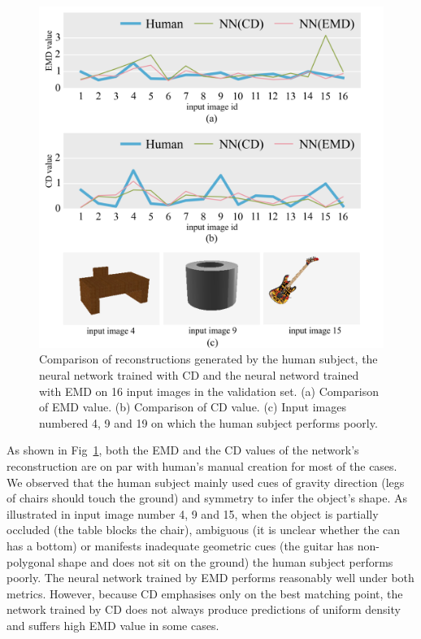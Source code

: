 \begin{figure}
\centering
\includegraphics[width=1.0\linewidth]{./fig/show_human}
\caption{Comparison of reconstructions generated by the human subject, the neural network trained with CD and the neural netword trained with EMD on 16 input images in the validation set. (a) Comparison of EMD value. (b) Comparison of CD value. (c) Input images numbered 4, 9 and 19 on which the human subject performs poorly.}
\label{fig:human_number}
\end{figure}

As shown in Fig~\ref{fig:human_number}, both the EMD and the CD values of the network's reconstruction are on par with human's manual creation for most of the cases. We observed that the human subject mainly used cues of gravity direction (legs of chairs should touch the ground) and symmetry to infer the object's shape. As illustrated in input image number 4, 9 and 15, when the object is partially occluded (the table blocks the chair), ambiguous (it is unclear whether the can has a bottom) or manifests inadequate geometric cues (the guitar has non-polygonal shape and does not sit on the ground) the human subject performs poorly. The neural network trained by EMD performs reasonably well under both metrics. However, because CD emphasises only on the best matching point, the network trained by CD does not always produce predictions of uniform density and suffers high EMD value in some cases.

